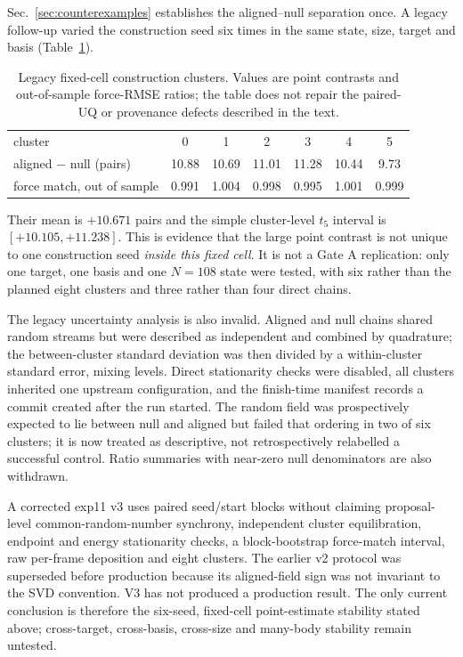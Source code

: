 \documentclass[aip,jcp,reprint,amsmath,amssymb,floatfix]{revtex4-2}
\begin{document}
Sec.~\ref{sec:counterexamples} establishes the aligned--null separation once.
A legacy follow-up varied the construction seed six times in the same state,
size, target and basis (Table~\ref{tab:clusters}).

\begin{table}[t]
\caption{\label{tab:clusters}Legacy fixed-cell construction clusters. Values
are point contrasts and out-of-sample force-RMSE ratios; the table does not
repair the paired-UQ or provenance defects described in the text.}
\begin{ruledtabular}
\begin{tabular}{lcccccc}
cluster & 0 & 1 & 2 & 3 & 4 & 5 \\
\colrule
aligned $-$ null (pairs) & 10.88 & 10.69 & 11.01 & 11.28 & 10.44 & 9.73 \\
force match, out of sample & 0.991 & 1.004 & 0.998 & 0.995 & 1.001 & 0.999 \\
\end{tabular}
\end{ruledtabular}
\end{table}

Their mean is $+10.671$ pairs and the simple cluster-level $t_5$ interval is
$[+10.105,+11.238]$. This is evidence that the large point contrast is not
unique to one construction seed \emph{inside this fixed cell}. It is not a Gate
A replication: only one target, one basis and one $N=108$ state were tested,
with six rather than the planned eight clusters and three rather than four
direct chains.

The legacy uncertainty analysis is also invalid. Aligned and null chains shared
random streams but were described as independent and combined by quadrature;
the between-cluster standard deviation was then divided by a within-cluster
standard error, mixing levels. Direct stationarity checks were disabled, all
clusters inherited one upstream configuration, and the finish-time manifest
records a commit created after the run started. The random field was
prospectively expected to lie between null and aligned but failed that ordering
in two of six clusters; it is now treated as descriptive, not retrospectively
relabelled a successful control. Ratio summaries with near-zero null
denominators are also withdrawn.

A corrected exp11 v3 uses paired seed/start blocks without claiming
proposal-level common-random-number synchrony, independent cluster
equilibration, endpoint and energy stationarity checks, a block-bootstrap
force-match interval, raw per-frame deposition and eight clusters. The earlier
v2 protocol was superseded before production because its aligned-field sign was
not invariant to the SVD convention. V3 has not produced a production result.
The only current conclusion is therefore the
six-seed, fixed-cell point-estimate stability stated above; cross-target,
cross-basis, cross-size and many-body stability remain untested.
\end{document}
